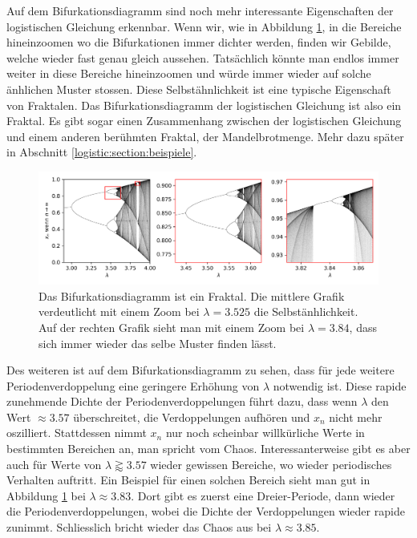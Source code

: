 Auf dem Bifurkationsdiagramm sind noch mehr 
interessante Eigenschaften der logistischen Gleichung erkennbar.
Wenn wir, wie in Abbildung \ref{fig:map_zoom}, in die Bereiche hineinzoomen
wo die Bifurkationen immer dichter werden, finden wir Gebilde, 
welche wieder fast genau gleich aussehen.
Tatsächlich könnte man endlos immer weiter in diese
Bereiche hineinzoomen und würde immer wieder auf solche änhlichen Muster stossen. 
Diese Selbstähnlichkeit ist eine typische Eigenschaft von Fraktalen.
%
%
Das Bifurkationsdiagramm der logistischen Gleichung ist also ein Fraktal.
Es gibt sogar einen Zusammenhang zwischen der logistischen Gleichung und 
einem anderen berühmten Fraktal, der Mandelbrotmenge.
%
Mehr dazu später in Abschnitt 
\ref{logistic:section:beispiele}.
\begin{figure}
    \includegraphics[width=\linewidth]{papers/logistic/figures/map_zoom.png}
    \caption{
        Das Bifurkationsdiagramm ist ein Fraktal.
        Die mittlere Grafik verdeutlicht mit einem Zoom 
        bei $\lambda = 3.525$ die Selbstänhlichkeit. 
        Auf der rechten Grafik sieht man mit einem
        Zoom bei $\lambda = 3.84$, dass sich immer
        wieder das selbe Muster finden lässt.
    }
    \label{fig:map_zoom}
\end{figure}

Des weiteren ist auf dem Bifurkationsdiagramm zu sehen,
dass für jede weitere Periodenverdoppelung eine geringere
Erhöhung von $\lambda$ notwendig ist.
Diese rapide zunehmende Dichte der Periodenverdoppelungen führt dazu, 
dass wenn $\lambda$ den Wert $\approx 3.57$ überschreitet, 
die Verdoppelungen aufhören und $x_n$ nicht mehr oszilliert. 
Stattdessen nimmt $x_n$ nur noch scheinbar 
willkürliche Werte in bestimmten Bereichen an, 
man spricht vom Chaos.
Interessanterweise gibt es aber auch für Werte von 
$\lambda \gtrapprox 3.57$ wieder gewissen Bereiche,
wo wieder periodisches Verhalten auftritt. 
Ein Beispiel für einen solchen Bereich sieht man
gut in Abbildung \ref{fig:map_zoom} bei 
$\lambda \approx 3.83$. 
Dort gibt es zuerst eine Dreier-Periode, 
dann wieder die Periodenverdoppelungen, 
wobei die Dichte der Verdoppelungen
wieder rapide zunimmt.
Schliesslich bricht wieder das Chaos aus bei 
$\lambda \approx 3.85$.
